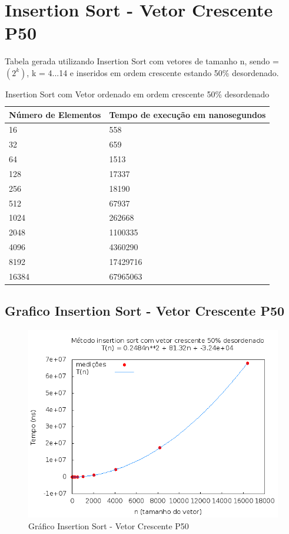 \documentclass[12pt,a4paper,twoside]{report}
\begin{document}
\section{Insertion Sort - Vetor Crescente P50}
Tabela gerada utilizando Insertion Sort com vetores de tamanho n, sendo = $(2^k)$, k = 4...14 e inseridos em ordem crescente estando 50\% desordenado.

\begin{table}[H]
\centering
\caption{Insertion Sort com Vetor ordenado em ordem crescente 50\% desordenado}
\label{my-label}
\begin{tabular}{|l|l|}
\hline
\multicolumn{1}{|c|}{\textbf{Número de Elementos}} & \multicolumn{1}{c|}{\textbf{Tempo de execução em nanosegundos}} \\ \hline
16 & 558 \\ \hline
32 & 659 \\ \hline
64 & 1513 \\ \hline
128 & 17337 \\ \hline
256 & 18190 \\ \hline
512 & 67937 \\ \hline
1024 & 262668 \\ \hline
2048 & 1100335 \\ \hline
4096 & 4360290 \\ \hline
8192 & 17429716 \\ \hline
16384 & 67965063 \\ \hline
\end{tabular}
\end{table}

\subsection{Grafico Insertion Sort - Vetor Crescente P50}
\begin{figure}[H]
    \centering
    \includegraphics[width=0.7\linewidth]{graficos/Insertion/vIntCrescenteP50/vIntCrescenteP50.png}
  \caption{Gráfico Insertion Sort - Vetor Crescente P50}
\end{figure}
\end{document}
